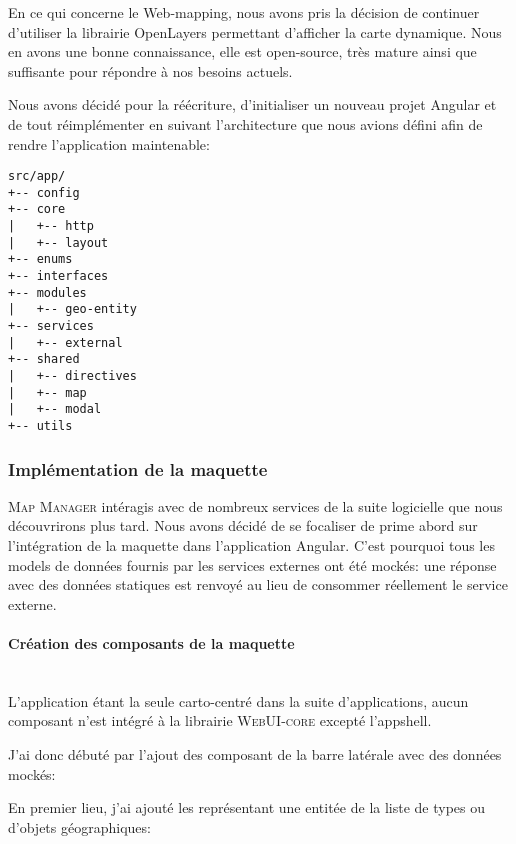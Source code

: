 \documentclass{rapportUHA40}
\begin{document}
En ce qui concerne le Web-mapping, nous avons pris la décision de continuer
d'utiliser la librairie OpenLayers permettant d'afficher la carte dynamique.
Nous en avons une bonne connaissance, elle est open-source, très mature ainsi
que suffisante pour répondre à nos besoins actuels.

Nous avons décidé pour la réécriture, d'initialiser un nouveau projet Angular
et de tout réimplémenter en suivant l'architecture que nous avions défini afin
de rendre l'application maintenable:
\begin{verbatim}
src/app/
+-- config
+-- core
|   +-- http
|   +-- layout
+-- enums
+-- interfaces
+-- modules
|   +-- geo-entity
+-- services
|   +-- external
+-- shared
|   +-- directives
|   +-- map
|   +-- modal
+-- utils
\end{verbatim}

\subsubsection{Implémentation de la maquette}
\textsc{Map Manager} intéragis avec de nombreux services de la suite logicielle que nous
découvrirons plus tard. Nous avons décidé de se focaliser de prime abord sur
l'intégration de la maquette dans l'application Angular. C'est pourquoi tous
les models de données fournis par les services externes ont été mockés: une
réponse  \fg{} avec des données statiques est renvoyé au lieu de
consommer réellement le service externe.

\paragraph{Création des composants de la maquette}\mbox{}\\
L'application étant la seule carto-centré dans la suite d'applications, aucun
composant n'est intégré à la librairie \textsc{WebUI-core} excepté
l'\gls{appshell}.

\newpage
J'ai donc débuté par l'ajout des composant de la barre latérale avec des
données mockés:


En premier lieu, j'ai ajouté les  \fg{} représentant une entitée de
la liste de types ou d'objets géographiques:
\end{document}
